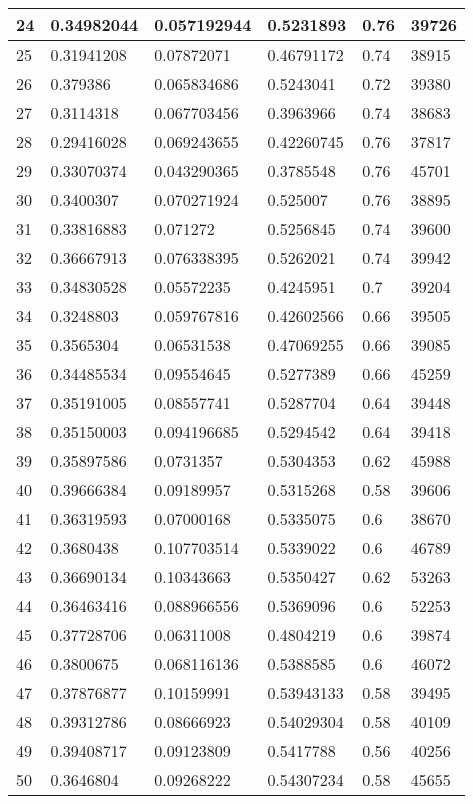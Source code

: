 \begin{longtable}{|l|l|l|l|l|l|}
24 & 0.34982044 & 0.057192944 & 0.5231893 & 0.76 & 39726 \\ \hline 
25 & 0.31941208 & 0.07872071 & 0.46791172 & 0.74 & 38915 \\ \hline 
26 & 0.379386 & 0.065834686 & 0.5243041 & 0.72 & 39380 \\ \hline 
27 & 0.3114318 & 0.067703456 & 0.3963966 & 0.74 & 38683 \\ \hline 
28 & 0.29416028 & 0.069243655 & 0.42260745 & 0.76 & 37817 \\ \hline 
29 & 0.33070374 & 0.043290365 & 0.3785548 & 0.76 & 45701 \\ \hline 
30 & 0.3400307 & 0.070271924 & 0.525007 & 0.76 & 38895 \\ \hline 
31 & 0.33816883 & 0.071272 & 0.5256845 & 0.74 & 39600 \\ \hline 
32 & 0.36667913 & 0.076338395 & 0.5262021 & 0.74 & 39942 \\ \hline 
33 & 0.34830528 & 0.05572235 & 0.4245951 & 0.7 & 39204 \\ \hline 
34 & 0.3248803 & 0.059767816 & 0.42602566 & 0.66 & 39505 \\ \hline 
35 & 0.3565304 & 0.06531538 & 0.47069255 & 0.66 & 39085 \\ \hline 
36 & 0.34485534 & 0.09554645 & 0.5277389 & 0.66 & 45259 \\ \hline 
37 & 0.35191005 & 0.08557741 & 0.5287704 & 0.64 & 39448 \\ \hline 
38 & 0.35150003 & 0.094196685 & 0.5294542 & 0.64 & 39418 \\ \hline 
39 & 0.35897586 & 0.0731357 & 0.5304353 & 0.62 & 45988 \\ \hline 
40 & 0.39666384 & 0.09189957 & 0.5315268 & 0.58 & 39606 \\ \hline 
41 & 0.36319593 & 0.07000168 & 0.5335075 & 0.6 & 38670 \\ \hline 
42 & 0.3680438 & 0.107703514 & 0.5339022 & 0.6 & 46789 \\ \hline 
43 & 0.36690134 & 0.10343663 & 0.5350427 & 0.62 & 53263 \\ \hline 
44 & 0.36463416 & 0.088966556 & 0.5369096 & 0.6 & 52253 \\ \hline 
45 & 0.37728706 & 0.06311008 & 0.4804219 & 0.6 & 39874 \\ \hline 
46 & 0.3800675 & 0.068116136 & 0.5388585 & 0.6 & 46072 \\ \hline 
47 & 0.37876877 & 0.10159991 & 0.53943133 & 0.58 & 39495 \\ \hline 
48 & 0.39312786 & 0.08666923 & 0.54029304 & 0.58 & 40109 \\ \hline 
49 & 0.39408717 & 0.09123809 & 0.5417788 & 0.56 & 40256 \\ \hline 
50 & 0.3646804 & 0.09268222 & 0.54307234 & 0.58 & 45655 \\ \hline 
\end{longtable}